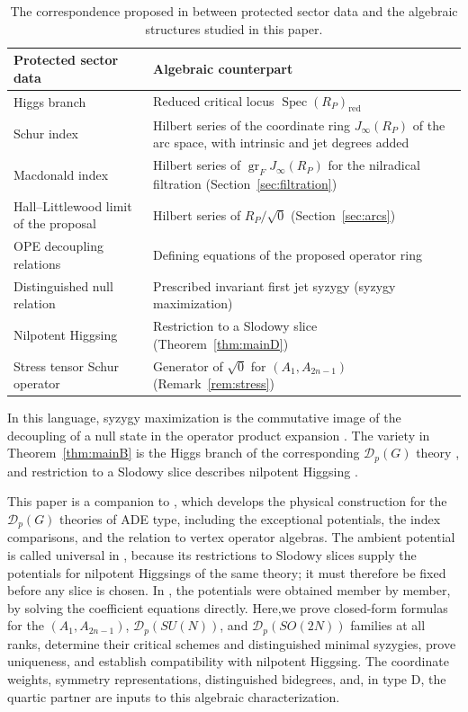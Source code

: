 \documentclass[10pt,reqno]{amsart}
\numberwithin{equation}{section}
\theoremstyle{plain}
\theoremstyle{definition}
\DeclareMathOperator{\Spec}{Spec}
\DeclareMathOperator{\gr}{gr}
\newcommand{\red}{\mathrm{red}}
\begin{document}
\begin{table}[ht]
\centering\small
\renewcommand{\arraystretch}{1.18}
\begin{tabular}{@{\phantom{S}}p{}p{}@{\phantom{S}}}
	\toprule
	Protected sector data & Algebraic counterpart\\\midrule
	Higgs branch & Reduced critical locus $\Spec (R_P)_\red$\\
	Schur index & Hilbert series of the coordinate ring $J_\infty(R_P)$ of the arc space, with intrinsic and jet degrees added\\
	Macdonald index & Hilbert series of $\gr_FJ_\infty(R_P)$ for the nilradical filtration (Section~\ref{sec:filtration})\\
	Hall--Littlewood limit of the proposal & Hilbert series of $R_P/\sqrt{0}$ (Section~\ref{sec:arcs})\\
	OPE decoupling relations & Defining equations of the proposed operator ring\\
	Distinguished null relation & Prescribed invariant first jet syzygy (syzygy maximization)\\
	Nilpotent Higgsing & Restriction to a Slodowy slice (Theorem~\ref{thm:mainD})\\
	Stress tensor Schur operator & Generator of $\sqrt{0}$ for $(A_1,A_{2n-1})$ (Remark~\ref{rem:stress})\\\bottomrule
\end{tabular}
\caption{The correspondence proposed in \cite{Kang:2025zub,Kang:2026nge,KLSnonpoint,Kang:2026ney} between protected sector data and the algebraic structures studied in this paper.}
\label{tab:dictionary}
\end{table}

In this language, syzygy maximization is the commutative image of the decoupling of a null state in the operator product expansion \cite{Kang:2026nge,Kang:2026ney}. The variety in Theorem~\ref{thm:mainB} is the Higgs branch of the corresponding $\mathcal{D}_p(G)$ theory \cite{Song:2017oew,Kang:2022zsl,Kang:2026ney}, and restriction to a Slodowy slice describes nilpotent Higgsing \cite{Chacaltana:2012zy,Beem:2014rza}.

This paper is a companion to \cite{Kang:2026ney}, which develops the physical construction for the $\mathcal{D}_p(G)$ theories of ADE type, including the exceptional potentials, the index comparisons, and the relation to vertex operator algebras. The ambient potential is called universal in \cite{KLSnonpoint,Kang:2026ney}, because its restrictions to Slodowy slices supply the potentials for nilpotent Higgsings of the same theory; it must therefore be fixed before any slice is chosen. In \cite{KLSnonpoint}, the potentials were obtained member by member, by solving the coefficient equations directly. Here,we prove closed-form formulas for the $(A_1,A_{2n-1})$, $\mathcal{D}_p(SU(N))$, and $\mathcal{D}_p(SO(2N))$ families at all ranks, determine their critical schemes and distinguished minimal syzygies, prove uniqueness, and establish compatibility with nilpotent Higgsing. The coordinate weights, symmetry representations, distinguished bidegrees, and, in type D, the quartic partner are inputs to this algebraic characterization.
\end{document}
